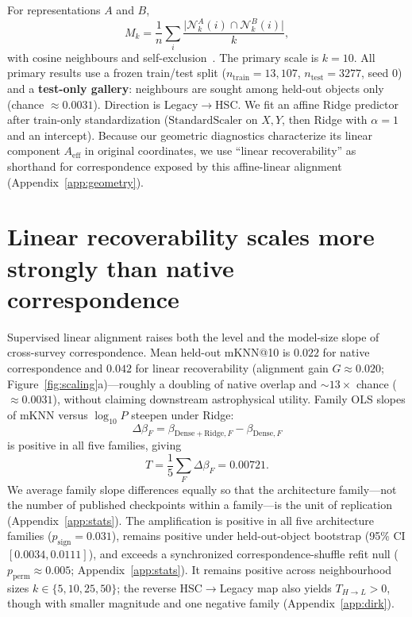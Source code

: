 \documentclass{article}
\begin{document}
For representations \(A\) and \(B\),
\[
M_k=\frac{1}{n}\sum_i
\frac{\lvert \mathcal N_k^A(i)\cap \mathcal N_k^B(i)\rvert}{k},
\]
with cosine neighbours and self-exclusion~\citep{huh2024platonic,duraphe2025platonicuniverse}.
The primary scale is \(k{=}10\).
All primary results use a frozen train/test split (\(n_{\mathrm{train}}{=}13{,}107\), \(n_{\mathrm{test}}{=}3277\), seed \(0\)) and a \textbf{test-only gallery}: neighbours are sought among held-out objects only (chance \(\approx 0.0031\)).
Direction is Legacy\(\to\)HSC\@.
We fit an affine Ridge predictor after train-only standardization (\(\mathrm{StandardScaler}\) on \(X,Y\), then Ridge with \(\alpha{=}1\) and an intercept).
Because our geometric diagnostics characterize its linear component \(A_{\mathrm{eff}}\) in original coordinates, we use ``linear recoverability'' as shorthand for correspondence exposed by this affine-linear alignment (Appendix~\ref{app:geometry}).

\section{Linear recoverability scales more strongly than native correspondence}\label{sec:scaling}

Supervised linear alignment raises both the level and the model-size slope of cross-survey correspondence.
Mean held-out mKNN@10 is \(0.022\) for native correspondence and \(0.042\) for linear recoverability (alignment gain \(G\approx0.020\); Figure~\ref{fig:scaling}a)---roughly a doubling of native overlap and \(\sim\!13\times\) chance (\(\approx0.0031\)), without claiming downstream astrophysical utility.
Family OLS slopes of mKNN versus \(\log_{10}P\) steepen under Ridge:
\[
\Delta\beta_F=\beta_{\mathrm{Dense+Ridge},F}-\beta_{\mathrm{Dense},F}
\]
is positive in all five families, giving
\[
T=\frac15\sum_F\Delta\beta_F=0.00721.
\]
We average family slope differences equally so that the architecture family---not the number of published checkpoints within a family---is the unit of replication (Appendix~\ref{app:stats}).
The amplification is positive in all five architecture families (\(p_{\mathrm{sign}}{=}0.031\)), remains positive under held-out-object bootstrap (95\% CI \([0.0034,0.0111]\)), and exceeds a synchronized correspondence-shuffle refit null (\(p_{\mathrm{perm}}\approx0.005\); Appendix~\ref{app:stats}).
It remains positive across neighbourhood sizes \(k\in\{5,10,25,50\}\); the reverse HSC\(\to\)Legacy map also yields \(T_{H\to L}>0\), though with smaller magnitude and one negative family (Appendix~\ref{app:dirk}).
\end{document}
